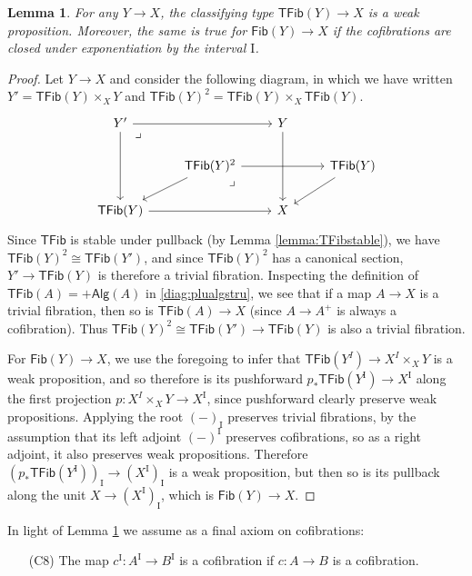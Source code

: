 \documentclass[12pt]{article}
\newcommand{\cof}{\ensuremath{\rightarrowtail}}
\renewcommand{\to}{\ensuremath{\rightarrow}}
\newcommand{\I}{\ensuremath{\mathrm{I}}}
\newcommand{\Fib}{\ensuremath{\mathsf{Fib}}}
\newcommand{\TFib}{\ensuremath{\mathsf{TFib}}}
\newtheorem{lemma}[theorem]{Lemma}
\theoremstyle{remark}
\theoremstyle{definition}
\newcommand{\pbmark}{\ar[dr, phantom, "\lrcorner" very near start, shift right=.5ex]}	%
\begin{document}
\begin{lemma}\label{lemma:Fibweakprop} For any $Y\to X$, the classifying type $\TFib(Y) \to X$ is a weak proposition.  Moreover, the same is true for $\Fib(Y)\to X$ if the cofibrations are closed under exponentiation by the interval $\I$.
\end{lemma}
%
%
\begin{proof}
Let $Y\to X$ and consider the following diagram, in which we have written $Y' = \TFib(Y)\times_X Y$ and $\TFib(Y)^2 = \TFib(Y)\times_X \TFib(Y)$.
%
\begin{equation}\label{diagram:TFibweakprop}
\begin{tikzcd}
Y' \ar[dd]  \ar[rr] \pbmark && Y \ar[dd]  \\
& \TFib(Y)^2 \ar[ld] \ar[rr]  \pbmark && \TFib(Y) \ar[ld] \\
\TFib(Y) \ar[rr] && X
\end{tikzcd}
\end{equation}
Since $\TFib$ is stable under pullback (by Lemma \ref{lemma:TFibstable}), we have $\TFib(Y)^2 \cong \TFib(Y')$, and since $\TFib(Y)^2$ has a canonical section, $Y' \to \TFib(Y)$ is therefore a trivial fibration.  Inspecting the definition of $\TFib(A) = +\mathsf{Alg}(A)$ in \eqref{diag:plualgstru}, we see that if a map $A\to X$ is a trivial fibration, then so is $\TFib(A)\to X$ (since $A\to A^+$ is always a cofibration). Thus $\TFib(Y)^2 \cong \TFib(Y') \to\TFib(Y)$ is also a trivial fibration.

For $\Fib(Y)\to X$, we use the foregoing to infer that $\TFib(Y^I) \to X^I\times_X Y$ is a weak proposition, and so therefore is its pushforward $p_*\TFib(Y^\I)\to X^\I$ along the first projection $p:X^I\times_X Y \to X^\I$, since pushforward clearly preserve weak propositions.  Applying the root $(-)_\I$ preserves trivial fibrations, by the assumption that its left adjoint $(-)^\I$ preserves cofibrations, so as a right adjoint, it also preserves weak propositions. Therefore $(p_*\TFib(Y^\I))_\I \to (X^\I)_\I$ is a weak proposition, but then so is its pullback along the unit $X\to (X^\I)_\I$, which is $\Fib(Y)\to X$.
\end{proof}

In light of Lemma \ref{lemma:Fibweakprop} we assume as a final axiom on cofibrations:
 
\begin{enumerate}
\item[(C8)] The map $c^\I:A^\I \to B^\I$ is a cofibration if $c:A \to B$ is a cofibration.
\end{enumerate}
\end{document}
